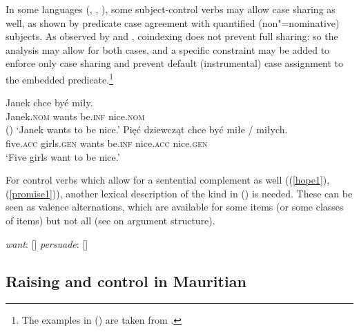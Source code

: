 In some  languages (, , ), some subject-control
verbs may allow case sharing as well, as shown by predicate case agreement with quantified
(non"=nominative) subjects. As observed by \citet{Przepiorkowski2004} and
\citet{PrzepiorkowskiandRosen2005}, coindexing does not prevent full sharing: so the analysis may
allow for both cases, and a specific constraint may be added to enforce only case sharing and
prevent default (instrumental) case assignment to the embedded predicate.\footnote{%
   The examples in () are taken from .
}

\begin{exe}
\ex \begin{xlist}
\ex 
\gll Janek chce byé miły.\\
     Janek.\textsc{nom} wants be.\textsc{inf} nice.\textsc{nom} \\ \hfill()
\glt `Janek wants to be nice.'
\ex 
\gll Pięć dziewcząt chce być miłe / miłych. \\
     five.\textsc{acc} girls.\textsc{gen} wants be.\textsc{inf} nice.\textsc{acc} {} nice.\textsc{gen}\\
\glt `Five girls want to be nice.'
	\end{xlist}
		
\end{exe}


For control verbs which allow for a sentential complement as well ((\ref{hope1}), (\ref{promise1})),
another lexical description of the kind in () is needed. These can be seen as valence alternations, which are
available for some items (or some classes of items) but not all (see  on argument structure).

\eal
\ex \emph{want}: [\argst {}]
\ex \emph{persuade}: [\argst {}]
\zl




\subsection{Raising and control in Mauritian} \label{sec-maurit}


